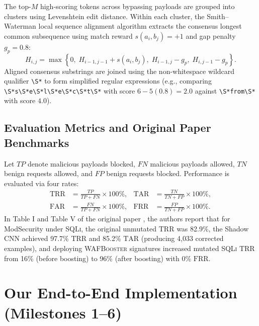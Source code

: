 \documentclass[conference]{IEEEtran}
\newcommand{\WAFB}{\textsc{WAFBooster}}
\newcommand{\SQLi}{\textsc{SQLi}}
\newcommand{\TRR}{\ensuremath{\mathrm{TRR}}}
\newcommand{\TAR}{\ensuremath{\mathrm{TAR}}}
\newcommand{\FAR}{\ensuremath{\mathrm{FAR}}}
\newcommand{\FRR}{\ensuremath{\mathrm{FRR}}}
\begin{document}
The top-$M$ high-scoring tokens across bypassing payloads are grouped into clusters using Levenshtein edit distance. Within each cluster, the Smith--Waterman local sequence alignment algorithm \cite{smithwaterman} extracts the consensus longest common subsequence using match reward $s(a_i,b_j) = +1$ and gap penalty $g_p = 0.8$:
\begin{equation}
H_{i,j}=\max\!\left\{0,\; H_{i-1,j-1}+s(a_i,b_j),\; H_{i-1,j}-g_p,\; H_{i,j-1}-g_p\right\}.
\label{eq:sw}
\end{equation}
Aligned consensus substrings are joined using the non-whitespace wildcard qualifier \texttt{\textbackslash S*} to form simplified regular expressions (e.g., comparing \texttt{\textbackslash S*s\textbackslash S*e\textbackslash S*l\textbackslash S*e\textbackslash S*c\textbackslash S*t\textbackslash S*} with score $6 - 5(0.8) = 2.0$ against \texttt{\textbackslash S*from\textbackslash S*} with score $4.0$).

\subsection{Evaluation Metrics and Original Paper Benchmarks}
Let $TP$ denote malicious payloads blocked, $FN$ malicious payloads allowed, $TN$ benign requests allowed, and $FP$ benign requests blocked. Performance is evaluated via four rates:
\begin{align}
\TRR &= \frac{TP}{TP+FN}\times 100\%, &
\TAR &= \frac{TN}{TN+FP}\times 100\%, \nonumber\\
\FAR &= \frac{FN}{TP+FN}\times 100\%, &
\FRR &= \frac{FP}{TN+FP}\times 100\%.
\label{eq:metrics}
\end{align}
In Table I and Table V of the original paper \cite{wu2025}, the authors report that for ModSecurity under \SQLi{}, the original unmutated \TRR{} was 82.9\%, the Shadow CNN achieved 97.7\% \TRR{} and 85.2\% \TAR{} (producing 4,033 corrected examples), and deploying \WAFB{} signatures increased mutated \SQLi{} \TRR{} from 16\% (before boosting) to 96\% (after boosting) with 0\% \FRR{}.

\section{Our End-to-End Implementation (Milestones 1--6)}
\end{document}

